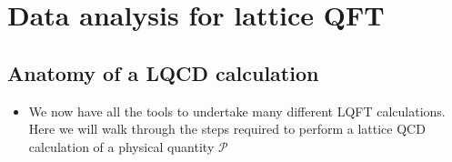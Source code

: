 \chapter{Data analysis for lattice QFT}
\label{ch:data-analysis}



\section{Anatomy of a LQCD calculation}
\begin{itemize}
\item We now have all the tools to undertake many different LQFT calculations. Here we will walk through the steps required to perform a lattice QCD calculation of a physical quantity $\mathcal{P}$
\end{itemize}
